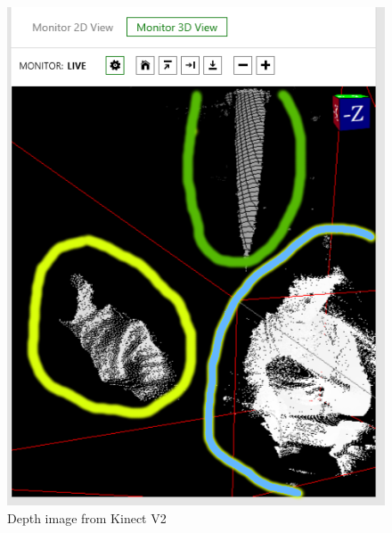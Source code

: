 \documentclass[11pt]{article}
\begin{document}
\begin{center}
	\begin{figure}[H]
		\begin{center}
			\includegraphics[scale=0.5]{pics/KinectDepth}
				\caption{Depth image from Kinect V2}
				\label{KinectDepth}
		\end{center}
	\end{figure}
\end{center}
\end{document}
